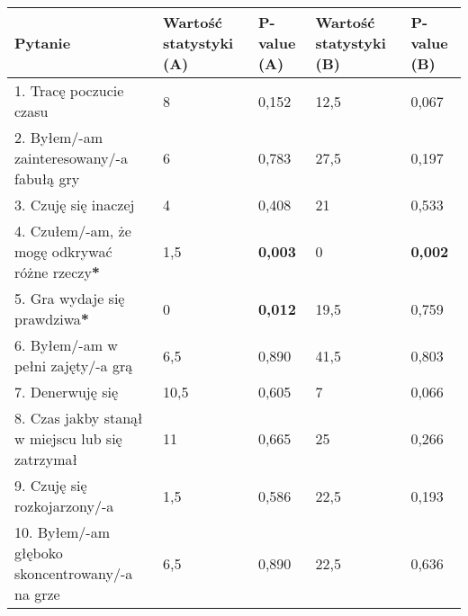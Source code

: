 \begin{table}[!h]
    \begin{center}
        \begin{tabular}{|m{12em}|m{5em}|m{4em}|m{5em}|m{4em}|}
            \hline
            Pytanie                                                           & Wartość statystyki (A) & P-value (A)    & Wartość statystyki (B) & P-value (B)    \\
            \hline
            1. Tracę poczucie czasu                                           & 8                      & 0,152          & 12,5                   & 0,067          \\
            2. Byłem/-am \newline zainteresowany/-a fabułą gry                & 6                      & 0,783          & 27,5                   & 0,197          \\
            3. Czuję się inaczej                                              & 4                      & 0,408          & 21                     & 0,533          \\
            4. Czułem/-am, że mogę odkrywać różne rzeczy\textbf{*}            & 1,5                    & \textbf{0,003} & 0                      & \textbf{0,002} \\
            5. Gra wydaje się prawdziwa\textbf{*}                             & 0                      & \textbf{0,012} & 19,5                   & 0,759          \\
            6. Byłem/-am \newline w pełni zajęty/-a grą                       & 6,5                    & 0,890          & 41,5                   & 0,803          \\
            7. Denerwuję się                                                  & 10,5                   & 0,605          & 7                      & 0,066          \\
            8. Czas jakby stanął w miejscu lub się zatrzymał                  & 11                     & 0,665          & 25                     & 0,266          \\
            9. Czuję się \newline rozkojarzony/-a                             & 1,5                    & 0,586          & 22,5                   & 0,193          \\
            10. Byłem/-am głęboko \newline skoncentrowany/-a \newline na grze & 6,5                    & 0,890          & 22,5                   & 0,636          \\

\end{tabular}
\end{center}
\end{table}
